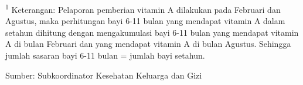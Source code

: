 {}

\vspace{2ex}
{\small
	\textsuperscript{1} Keterangan: Pelaporan pemberian vitamin A dilakukan pada Februari dan Agustus, maka perhitungan bayi 6-11 bulan yang mendapat vitamin A dalam setahun dihitung dengan mengakumulasi bayi 6-11 bulan yang mendapat vitamin A di bulan Februari dan yang mendapat vitamin A di bulan Agustus. Sehingga jumlah sasaran bayi 6-11 bulan = jumlah bayi setahun.
	
}
\vfill
Sumber: Subkoordinator Kesehatan Keluarga dan Gizi\par 
